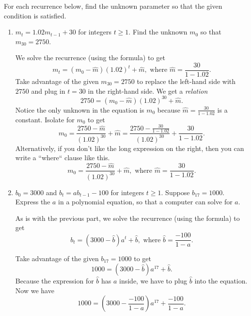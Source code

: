 \documentclass[../main.tex]{subfiles}
\begin{document}
\begin{exercise}
  For each recurrence below, find the unknown parameter so that the given condition is satisfied.


  \begin{enumerate}
    \item \(m_{t} = 1.02 m_{t-1} + 30\) for integers \(t \ge 1\).  Find the unknown \(m_{0}\) so that \(m_{30} = 2750\).

      \begin{solution}
        We solve the recurrence (using the formula) to get \[m_{t} = (m_{0} - \hat{m})\left( 1.02 \right)^{t} + \hat{m}, \text{ where }\hat{m} = \frac{30}{1 - 1.02}.\]  Take advantage of the given \(m_{30} = 2750\) to replace the left-hand side with \(2750\) and plug in \(t = 30\) in the right-hand side. We get a \emph{relation}
        \[
          2750 = (m_{0} - \hat{m})(1.02)^{30} + \hat{m}.
        \]
        Notice the only unknown in the equation is \(m_{0}\) because \(\hat{m} = \frac{30}{1 - 1.02}\) is a constant. Isolate for \(m_{0}\) to get 
        \[
          m_{0} = \frac{2750 - \hat{m}}{(1.02)^{30}} + \hat{m} = \frac{2750 - \frac{30}{1 - 1.02}}{(1.02)^{30}} + \frac{30}{1 - 1.02}.
        \]
        Alternatively, if you don't like the long expression on the right, then you can write a ``where`` clause like this.
        \[
          m_{0} = \frac{2750 - \hat{m}}{(1.02)^{30}} + \hat{m}, \text{ where } \hat{m} = \frac{30}{1 - 1.02}.
        \]
      \end{solution}

    \item \(b_{0} = 3000\) and \(b_{t} = a b_{t-1} - 100\) for integers \(t \ge 1\).  Suppose \(b_{17} = 1000\). Express the \(a\) in a polynomial equation, so that a computer can solve for \(a\).

      \begin{solution}
        As is with the previous part, we solve the recurrence (using the formula) to get
        \[
          b_{t} = (3000 - \hat{b}) a^{t} + \hat{b}, \text{ where } \hat{b} = \frac{-100}{1 - a}.
        \]

        Take advantage of the given \(b_{17} = 1000\) to get
        \[
          1000 = (3000 - \hat{b}) a^{17} + \hat{b}.
        \]
        Because the expression for \(\hat{b}\) has \(a\) inside, we have to plug \(\hat{b}\) into the equation. Now we have
        \[
          1000 = \left(3000 - \frac{-100}{1 - a}\right) a^{17} + \frac{-100}{1 - a}.
        \]


\end{solution}
\end{enumerate}
\end{exercise}
\end{document}
